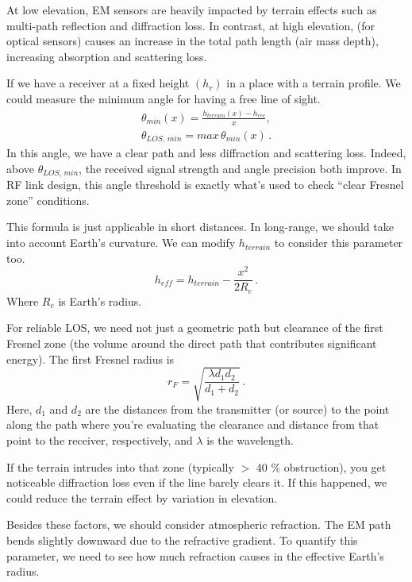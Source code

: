 \documentclass{article}
\begin{document}
At low elevation, EM sensors are heavily impacted by terrain effects such as multi-path reflection and diffraction loss. In contrast, at high elevation, (for optical sensors) causes an increase in the total path length (air mass depth), increasing absorption and scattering loss.

If we have a receiver at a fixed height $(h_r)$ in a place with a terrain profile. We could measure the minimum angle for having a free line of sight.
\begin{align}
    \theta_{min}(x) = \frac{h_{terrain}(x) - h_{rec}}{x}, \\
    \theta_{LOS,\, min} = max\, \theta_{min}(x)\,.
\end{align}
In this angle, we have a clear path and less diffraction and scattering loss. Indeed, 
above $\theta_{LOS,\, min}$, the received signal strength and angle precision both improve. In RF link design, this angle threshold is exactly what’s used to check “clear Fresnel zone” conditions.

This formula is just applicable in short distances. In long-range, we should take into account Earth's curvature. We can modify $h_{terrain}$ to consider this parameter too.
\begin{equation}
    h_{eff} = h_{terrain} - \frac{x^2}{2R_e}\,.
    \label{eq:curve-earth}
\end{equation}
Where $R_e$ is Earth's radius.

For reliable LOS, we need not just a geometric path but clearance of the first Fresnel zone (the volume around the direct path that contributes significant energy).
The first Fresnel radius is
\begin{equation}
    r_F = \sqrt{\frac{\lambda d_1 d_2}{d_1 + d_2}}\, .
\end{equation}
Here, $d_1$ and $d_2$ are the distances from the transmitter (or source) to the point along the path where you’re evaluating the clearance and distance from that point to the receiver, respectively, and $\lambda$ is the wavelength.


If the terrain intrudes into that zone (typically $>$ 40 \% obstruction), you get noticeable diffraction loss even if the line barely clears it. If this happened, we could reduce the terrain effect by variation in elevation.

Besides these factors, we should consider atmospheric refraction. The EM path bends slightly downward due to the refractive gradient. To quantify this parameter, we need to see how much refraction causes in the effective Earth's radius.
\end{document}
